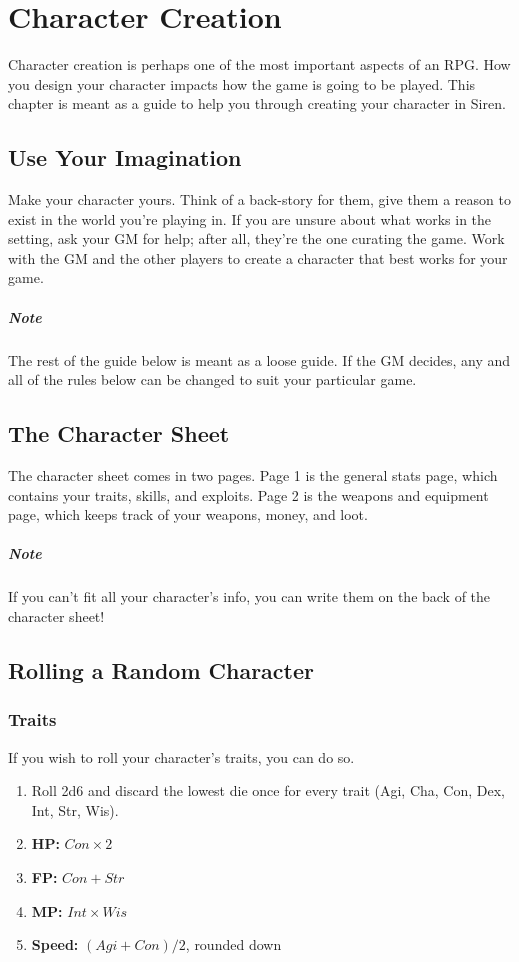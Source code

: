 \chapter{Character Creation}
Character creation is perhaps one of the most important aspects of an RPG.
How you design your character impacts how the game is going to be played.
This chapter is meant as a guide to help you through creating your character in Siren.

\section{Use Your Imagination}
Make your character yours.
Think of a back-story for them, give them a reason to exist in the world you're playing in.
If you are unsure about what works in the setting, ask your GM for help; after all, they're the one curating the game.
Work with the GM and the other players to create a character that best works for your game.

\paragraph{Note} The rest of the guide below is meant as a loose guide.
If the GM decides, any and all of the rules below can be changed to suit your particular game.

\section{The Character Sheet}
The character sheet comes in two pages.
Page 1 is the general stats page, which contains your traits, skills, and exploits.
Page 2 is the weapons and equipment page, which keeps track of your weapons, money, and loot.

\paragraph{Note} If you can't fit all your character's info, you can write them on the back of the character sheet!

\section{Rolling a Random Character}
\subsection{Traits}
If you wish to roll your character's traits, you can do so.
\begin{enumerate}
\item Roll 2d6 and discard the lowest die once for every trait (Agi, Cha, Con, Dex, Int, Str, Wis).
\item \textbf{HP:} $Con \times 2$
\item \textbf{FP:} $Con + Str$
\item \textbf{MP:} $Int \times Wis$
\item \textbf{Speed:} $(Agi + Con) / 2$, rounded down
\end{enumerate}

